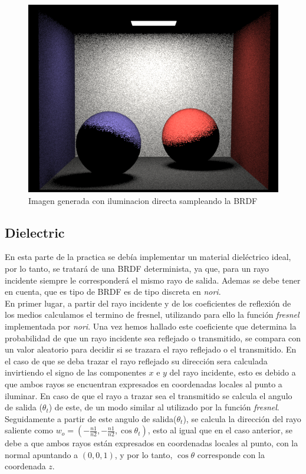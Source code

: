 \documentclass[10pt,oneside,a4paper]{article}
\begin{document}
\begin{figure}[h]
\centering
\includegraphics[width=.6\linewidth]{images/cbox_direct_mats_diff_512.png}
\caption{Imagen generada con iluminacion directa sampleando la BRDF}
\label{fig:disp}
\end{figure}


\subsection{Dielectric}
En esta parte de la practica se debía implementar un material dieléctrico ideal, por lo tanto, se tratará de una BRDF determinista, ya que, para un rayo incidente siempre le corresponderá el mismo rayo de salida. Ademas se debe tener en cuenta, que es tipo de BRDF es de tipo discreta en \textit{nori}.\\

En primer lugar, a partir del rayo incidente y de los coeficientes de reflexión de los medios calculamos el termino de fresnel, utilizando para ello la función \textit{fresnel} implementada por \textit{nori}. Una vez hemos hallado este coeficiente que determina la probabilidad de que un rayo incidente sea reflejado o transmitido, se compara con un valor aleatorio para decidir si se trazara el rayo reflejado o el transmitido. En el caso de que se deba trazar el rayo reflejado su dirección sera calculada invirtiendo el signo de las componentes $x$ e $y$ del rayo incidente, esto es debido a que ambos rayos se encuentran expresados en coordenadas locales al punto a iluminar. En caso de que el rayo a trazar sea el transmitido se calcula el angulo de salida ($\theta_t$) de este, de un modo similar al utilizado por la función \textit{fresnel}. Seguidamente a partir de este angulo de salida($\theta_t$), se calcula la dirección del rayo saliente como
 $ w_o = (-\frac{n1}{n2},-\frac{n1}{n2},\cos\theta_t)$, esto al igual que en el caso anterior, se debe a que ambos rayos están expresados en coordenadas locales al punto, con la normal apuntando a $(0,0,1)$, y por lo tanto, $\cos\theta$ corresponde con la coordenada $z$.\\
 
\end{document}
